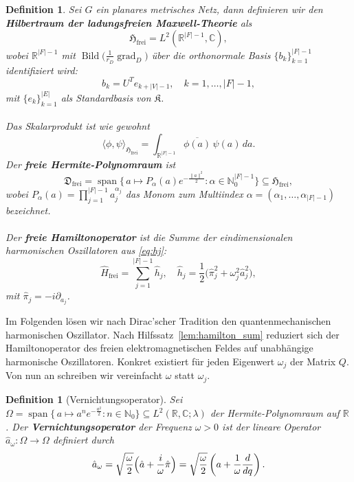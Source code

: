 \documentclass[11pt,a4paper,leqno]{report}
\newtheorem{definition}[theorem]{Definition}
\numberwithin{equation}{chapter}
\begin{document}
\begin{definition}
	Sei \(G\) ein planares metrisches Netz, dann definieren wir den \textbf{Hilbertraum der ladungsfreien Maxwell-Theorie} als
	\[
	\mathfrak{H}_{\mathrm{frei}} = L^2(\mathbb{R}^{|F|-1}, \mathbb{C}),
	\]
	wobei \(\mathbb{R}^{|F|-1}\) mit \(\operatorname{Bild}\bigl(\frac{1}{r_D}\operatorname{grad}_D\bigr)\) 
	über die orthonormale Basis \(\{b_k\}_{k=1}^{|F|-1}\) identifiziert wird:
	\[
	b_k = U^T e_{k + |V|-1}, \quad k=1,\dots,|F|-1,
	\]
	mit \(\{e_k\}_{k=1}^{|E|}\) als Standardbasis von \(\mathfrak{K}\).\\
	\\
	Das Skalarprodukt ist wie gewohnt
	\[
	\langle \phi, \psi \rangle_{\mathfrak{H}_{\mathrm{frei}}} 
	= \int_{\mathbb{R}^{|F|-1}} \overline{\phi(a)}\, \psi(a)\, da.
	\]
	Der \textbf{freie Hermite-Polynomraum} ist
	\begin{equation}
		\mathfrak{D}_{\mathrm{frei}} 
		= \operatorname{span}\bigl\{\,a \mapsto P_\alpha(a) 
		e^{-\frac{\|a\|^2}{2}} : \alpha\in\mathbb{N}_0^{|F|-1}\bigr\}
		\subseteq \mathfrak{H}_{\mathrm{frei}}, \label{def:hermite_frei}
	\end{equation}
	wobei \(P_\alpha(a) = \prod_{j=1}^{|F|-1} a_j^{\alpha_j}\) das Monom zum Multiindex 
	\(\alpha = (\alpha_1,\dots,\alpha_{|F|-1})\) bezeichnet.\\
	\\
	Der \textbf{freie Hamiltonoperator} ist die Summe der eindimensionalen harmonischen 
	Oszillatoren aus \eqref{eq:hj}:
	\begin{equation}
		\hat{H}_{\mathrm{frei}} = \sum_{j=1}^{|F|-1} \hat{h}_j, \quad
		\hat{h}_j = \frac{1}{2}\bigl(\hat{\pi}_j^2 + \omega_j^2 \hat{a}_j^2\bigr), \label{eq:free_hamilton}
	\end{equation}
	mit \(\hat{\pi}_j = -i\partial_{a_j}\).
\end{definition}
\noindent
Im Folgenden lösen wir nach Dirac'scher Tradition den quantenmechanischen harmonischen 
Oszillator. Nach Hilfssatz~\ref{lem:hamilton_sum} reduziert sich der Hamiltonoperator 
des freien elektromagnetischen Feldes auf unabhängige harmonische Oszillatoren. Konkret existiert 
für jeden Eigenwert $\omega_j$ der Matrix $Q$. Von nun an schreiben wir 
vereinfacht $\omega$ statt $\omega_j$.  
\begin{definition}[Vernichtungsoperator]\label{def:Vernichtung}
	Sei $\Omega = \operatorname{span}\bigl\{\,a \mapsto a^n 
	e^{-\frac{a^2}{2}} : n\in\mathbb{N}_0\bigr\} \subseteq L^2(\mathbb{R}, \mathbb{C}; \lambda)$
	der Hermite-Polynomraum auf $\mathbb{R}$. Der \textbf{Vernichtungsoperator} der Frequenz 
	$\omega > 0$ ist der lineare Operator $\hat{a}_\omega: \Omega \to \Omega$ definiert durch
	\begin{equation}
		\hat{a}_\omega = \sqrt{\frac{\omega}{2}}\Bigl(\hat{a} + \frac{i}{\omega}\hat{\pi}\Bigr)
		= \sqrt{\frac{\omega}{2}}\left(a + \frac{1}{\omega}\frac{d}{dq}\right). \label{eq:annihilation}
	\end{equation}
\end{definition}
\end{document}
